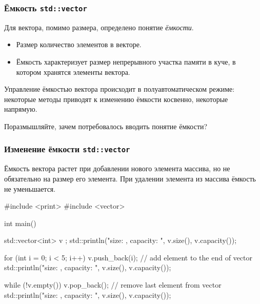\documentclass[compress, 8pt, aspectratio=169]{beamer}
\begin{document}
  \begin{frame}[fragile]

    \frametitle{Ёмкость \texttt{std::vector}}

    Для вектора, помимо размера, определено понятие \textit{ёмкости}.
    \hfill \break

    \begin{itemize}
      \item Размер \textemdash \space количество элементов в векторе.
      \item Ёмкость \textemdash \space характеризует размер непрерывного
        участка памяти в куче, в котором хранятся элементы вектора.
    \end{itemize}
    \hfill \break

    Управление ёмкостью вектора происходит в полуавтоматическом режиме:
    некоторые методы приводят к изменению ёмкости косвенно,
    некоторые \textemdash \space напрямую.

    \begin{task}
      Поразмышляйте, зачем потребовалось вводить понятие ёмкости?
    \end{task}

  \end{frame}

  \begin{frame}[fragile]

    \frametitle{Изменение ёмкости \texttt{std::vector}}

    Ёмкость вектора растет при добавлении нового элемента массива,
    но не обязательно на размер его элемента.
    При удалении элемента из массива ёмкость не уменьшается.

    \begin{mycppinplacelisting}[after skip=0mm]
#include <print>
#include <vector>

int main() {
    std::vector<int> v {};
    std::println("size: {}, capacity: {}",
        v.size(), v.capacity());

    for (int i = 0; i < 5; i++) {
        v.push_back(i); // add element to the end of vector
        std::println("size: {}, capacity: {}",
            v.size(), v.capacity());
    }

    while (!v.empty()) {
        v.pop_back(); // remove last element from vector
        std::println("size: {}, capacity: {}",
            v.size(), v.capacity());
    }
}
    \end{mycppinplacelisting}

  \end{frame}
\end{document}
